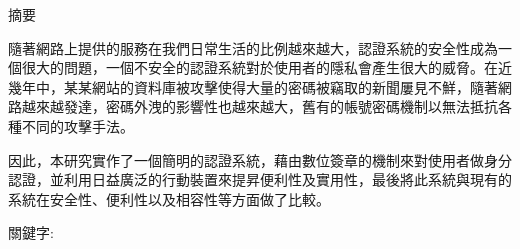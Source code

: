 

\doublespacing

%
\onehalfspacing

\begin{titlepage}
\begin{CJK}{UTF8}{bkai}
\begin{center}
\Large{{摘要}}\\
\end{center}

隨著網路上提供的服務在我們日常生活的比例越來越大，認證系統的安全性成為一個很大的問題，一個不安全的認證系統對於使用者的隱私會產生很大的威脅。在近幾年中，某某網站的資料庫被攻擊使得大量的密碼被竊取的新聞屢見不鮮，隨著網路越來越發達，密碼外洩的影響性也越來越大，舊有的帳號密碼機制以無法抵抗各種不同的攻擊手法。

因此，本研究實作了一個簡明的認證系統，藉由數位簽章的機制來對使用者做身分認證，並利用日益廣泛的行動裝置來提昇便利性及實用性，最後將此系統與現有的系統在安全性、便利性以及相容性等方面做了比較。

\vspace*{5em}

{關鍵字:} \emph{}


\end{CJK}
\end{titlepage}

%
